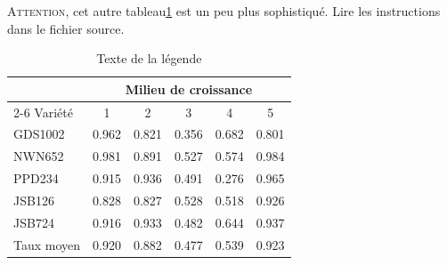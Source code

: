 \textsc{Attention}, cet autre tableau\ref{tab:template} est un peu plus sophistiqué. Lire les instructions dans le fichier source.
\bigskip

\begin{table} 									%
\centering 										%
\begin{tabular}{l c c c c c} 							%
\toprule 										%
& \multicolumn{5}{c}{Milieu de croissance} \\ 			%
\cmidrule(l){2-6} 								%
Variété & 1 & 2 & 3 & 4 & 5\\ 						%
\midrule 										%
GDS1002 & 0.962 & 0.821 & 0.356 & 0.682 & 0.801\\ 	%
NWN652 & 0.981 & 0.891 & 0.527 & 0.574 & 0.984\\ 	%
PPD234 & 0.915 & 0.936 & 0.491 & 0.276 & 0.965\\ 		%
JSB126 & 0.828 & 0.827 & 0.528 & 0.518 & 0.926\\		%
JSB724 & 0.916 & 0.933 & 0.482 & 0.644 & 0.937\\ 		%
\midrule										%
\midrule 										%
Taux moyen & 0.920 & 0.882 & 0.477 & 0.539 & 0.923\\	 %
\bottomrule 									%
\end{tabular}
\caption{Texte de la légende}						%
\label{tab:template} 								%
\end{table}


